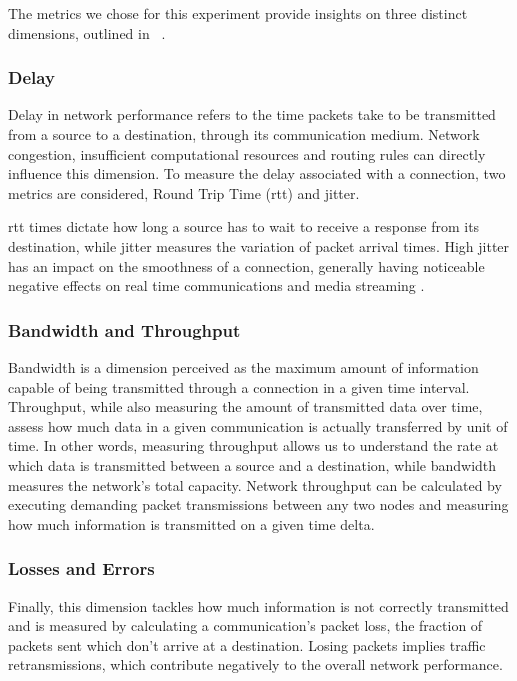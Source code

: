 \documentclass[11pt,twoside,a4paper]{report}
\begin{document}
The metrics we chose for this experiment provide insights on three distinct dimensions, outlined in ~\cite{livronet, Hanemann2006}.

\subsubsection{Delay}

Delay in network performance refers to the time packets take to be transmitted from a source to a destination, through its communication medium. Network congestion, insufficient computational resources and routing rules can directly influence this dimension. To measure the delay associated with a connection, two metrics are considered, Round Trip Time (\ac{rtt}) and jitter.

\ac{rtt} times dictate how long a source has to wait to receive a response from its destination, while jitter measures the variation of packet arrival times. High jitter has an impact on the smoothness of a connection, generally having noticeable negative effects on real time communications and media streaming \cite{claypool1999effects}.

\subsubsection{Bandwidth and Throughput}

Bandwidth is a dimension perceived as the maximum amount of information capable of being transmitted through a connection in a given time interval. Throughput, while also measuring the amount of transmitted data over time, assess how much data in a given communication is actually transferred by unit of time. In other words, measuring throughput allows us to understand the rate at which data is transmitted between a source and a destination, while bandwidth measures the network's total capacity. Network throughput can be calculated by executing demanding packet transmissions between any two nodes and measuring how much information is transmitted on a given time delta.

\subsubsection{Losses and Errors}

Finally, this dimension tackles how much information is not correctly transmitted and is measured by calculating a communication's packet loss, the fraction of packets sent which don't arrive at a destination. Losing packets implies traffic retransmissions, which contribute negatively to the overall network performance.
\end{document}
